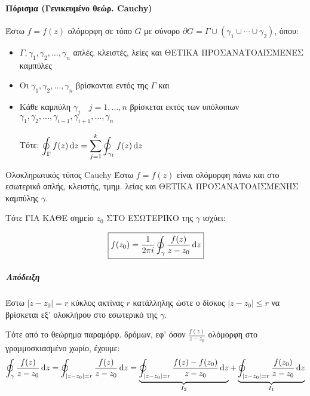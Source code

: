 \documentclass[12pt,a4paper,titlepage,fleqn]{article}
\begin{document}
    \paragraph{Πόρισμα (Γενικευμένο θεώρ. Cauchy)} 
    Έστω \( f=f(z) \) ολόμορφη σε τόπο \( G \) με σύνορο \( \partial G =
    \Gamma \cup \left( \gamma_1 \cup \cdots \cup \gamma_2 \right)
    \), όπου:
    \begin{itemize}
       	\item \( \Gamma, \gamma_1,\gamma_2,\dots,\gamma_n \) απλές, κλειστές, λείες
       	και ΘΕΤΙΚΑ ΠΡΟΣΑΝΑΤΟΛΙΣΜΕΝΕΣ καμπύλες
       	\item Οι \( \gamma_1,\gamma_2,\dots,\gamma_n \) βρίσκονται εντός της
       	\( \Gamma \) και
       	\item Κάθε καμπύλη \( \gamma_j \quad j=1,\dots,n \) βρίσκεται εκτός των
       	υπόλοιπων
       	\( \gamma_1,\gamma_2,\dots,\gamma_{i-1},\gamma_{i+1},\dots,\gamma_n \)
       	
       	Τότε: \( 
       	\displaystyle \oint_\Gamma f(z)\dif z= \sum_{j=1}^k \oint_{\gamma_1}f(z)
       	\dif z
       	\)
    \end{itemize}
    
    \begin{theorem*}[width=.8\textwidth]{Ολοκληρωτικός τύπος Cauchy}
    	\vspace{25pt}
    	Έστω \( f=f(z) \) είναι ολόμορφη πάνω και στο εσωτερικό απλής, κλειστής,
    	τμημ. λείας και { \large ΘΕΤΙΚΑ ΠΡΟΣΑΝΑΤΟΛΙΣΜΕΝΗΣ  } καμπύλης \( \gamma \).
    	
    	Τότε { \large ΓΙΑ ΚΑΘΕ } σημείο \( z_0 \) ΣΤΟ ΕΣΩΤΕΡΙΚΟ της \( \gamma \)
    	ισχύει:
    	
    	\[
    	\boxed{
    		f(z_0) = \frac{1}{2\pi i}\oint_\gamma
    		\frac{f(z)}{z-z_0}\dif z
    		}
    	\]
    \end{theorem*}
    \subparagraph{Απόδειξη}
    
    Έστω \( \left|z-z_0\right| =r \) κύκλος ακτίνας \( r \) κατάλληλης ώστε ο δίσκος
    \( \left|z-z_0\right| \leq r \) να βρίσκεται εξ' ολοκλήρου στο εσωτερικό της
    \( \gamma \).
    
    Τότε από το θεώρημα παραμόρφ. δρόμων, εφ' όσον \( \frac{f(z)}{z-z_0} \) ολόμορφη
    στο γραμμοσκιασμένο χωρίο, έχουμε:
    \[
    \oint_\gamma \frac{f(z)}{z-z_0} \dif z =
    \oint_{\left|z-z_0\right|=r} \frac{f(z)}{z-z_0}\dif z
    = \underbrace{\oint_{\left|z-z_0\right|=r} \frac{f(z)-f(z_0)}{z-z_0}\dif z}_{I_2}
    +\underbrace{\oint_{\left|z-z_0\right|=r} \frac{f(z_0)}{z-z_0}\dif z}_{I_1}
    \]
    
\end{document}
